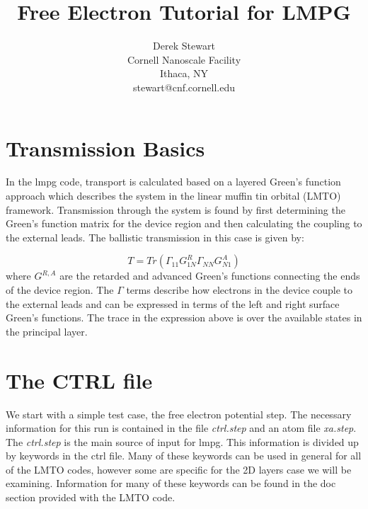 \documentclass[10pt]{article}
\begin{document}
\title{Free Electron Tutorial for LMPG}
\author{Derek Stewart \\ Cornell Nanoscale Facility \\ Ithaca, NY \\ stewart@cnf.cornell.edu}
\maketitle

\section{Transmission Basics}

In the lmpg code, transport is calculated based on a layered Green's function approach which describes the system in the linear muffin tin orbital (LMTO) framework.  Transmission through the system is found by first determining the Green's function matrix for the device region and then calculating the coupling to the external leads.  The ballistic transmission in this case is given by:

\begin{equation}
T=Tr\left(\Gamma_{11}G^{R}_{1N}\Gamma_{NN}G^{A}_{N1}\right)
\end{equation}
where $G^{R,A}$ are the retarded and advanced Green's functions connecting the ends of the device region.  The $\Gamma$ terms describe how electrons in the device couple to the external leads and can be expressed in terms of the left and right surface Green's functions.  The trace in the expression above is over the available states in the principal layer.

\section{The CTRL file}

We start with a simple test case, the free electron potential step.  The necessary information for this run is contained in the file \textit{ctrl.step} and an atom file \textit{xa.step}.  The \textit{ctrl.step} is the main source of input for lmpg.  This information is divided up by keywords in the ctrl file.  Many of these keywords can be used in general for all of the LMTO codes, however some are specific for the 2D layers case we will be examining.  Information for many of these keywords can be found in the doc section provided with the LMTO code.
\end{document}
